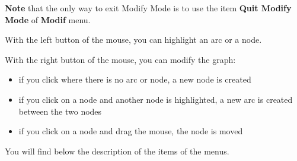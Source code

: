 \documentclass[11pt]{article}
\begin{document}
\textbf{Note} that the only way to exit Modify Mode is to use the item 
\textbf{Quit Modify Mode} of \textbf{Modif} menu.


With the left button of the mouse, you can highlight an arc or a node.

With the right button of the mouse, you can modify the graph:
\begin{itemize}
\item if you click where there is no arc or node, a new node is created
\item if you click on a node and another node is highlighted, a new
	arc is created between the two nodes
\item if you click on a node and drag the mouse, the node is moved
\end{itemize}

You will find below the description of the items of the menus.
\end{document}

